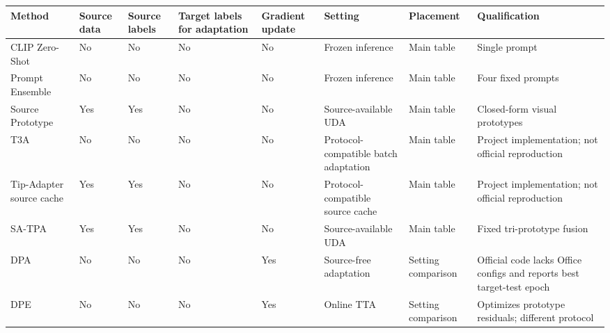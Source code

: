 \begin{tabular}{llllllll}
\toprule
Method & Source data & Source labels & Target labels for adaptation & Gradient update & Setting & Placement & Qualification \\
\midrule
CLIP Zero-Shot & No & No & No & No & Frozen inference & Main table & Single prompt \\
Prompt Ensemble & No & No & No & No & Frozen inference & Main table & Four fixed prompts \\
Source Prototype & Yes & Yes & No & No & Source-available UDA & Main table & Closed-form visual prototypes \\
T3A & No & No & No & No & Protocol-compatible batch adaptation & Main table & Project implementation; not official reproduction \\
Tip-Adapter source cache & Yes & Yes & No & No & Protocol-compatible source cache & Main table & Project implementation; not official reproduction \\
SA-TPA & Yes & Yes & No & No & Source-available UDA & Main table & Fixed tri-prototype fusion \\
DPA & No & No & No & Yes & Source-free adaptation & Setting comparison & Official code lacks Office configs and reports best target-test epoch \\
DPE & No & No & No & Yes & Online TTA & Setting comparison & Optimizes prototype residuals; different protocol \\
\bottomrule
\end{tabular}
